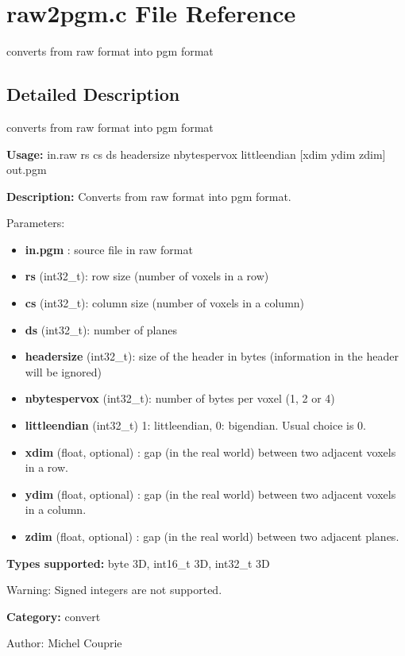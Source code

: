 \section{raw2pgm.c File Reference}
\label{raw2pgm_8c}
converts from raw format into pgm format 



\subsection{Detailed Description}
converts from raw format into pgm format 

{\bf Usage:} in.raw rs cs ds headersize nbytespervox littleendian [xdim ydim zdim] out.pgm

{\bf Description:} Converts from raw format into pgm format.

Parameters: \begin{itemize}
\item {\bf in.pgm} : source file in raw format \item {\bf rs} (int32\_\-t): row size (number of voxels in a row) \item {\bf cs} (int32\_\-t): column size (number of voxels in a column) \item {\bf ds} (int32\_\-t): number of planes \item {\bf headersize} (int32\_\-t): size of the header in bytes (information in the header will be ignored) \item {\bf nbytespervox} (int32\_\-t): number of bytes per voxel (1, 2 or 4) \item {\bf littleendian} (int32\_\-t) 1: littleendian, 0: bigendian. Usual choice is 0. \item {\bf xdim} (float, optional) : gap (in the real world) between two adjacent voxels in a row. \item {\bf ydim} (float, optional) : gap (in the real world) between two adjacent voxels in a column. \item {\bf zdim} (float, optional) : gap (in the real world) between two adjacent planes.\end{itemize}
{\bf Types supported:} byte 3D, int16\_\-t 3D, int32\_\-t 3D

\begin{Desc}
\item[Warning:]Signed integers are not supported.\end{Desc}
{\bf Category:} convert

\begin{Desc}
\item[Author:]Michel Couprie \end{Desc}
